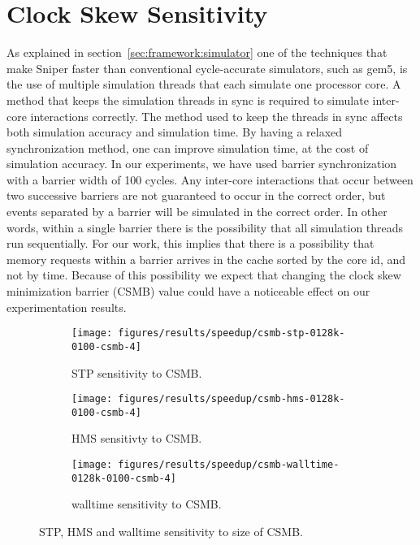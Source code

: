 \section{Clock Skew Sensitivity}
\label{sec:results:csmb_sensitivity}

As explained in section~\ref{sec:framework:simulator} one of the techniques that make Sniper faster than conventional cycle-accurate simulators, such as gem5, is the use of multiple simulation threads that each simulate one processor core.
A method that keeps the simulation threads in sync is required to simulate inter-core interactions correctly.
The method used to keep the threads in sync affects both simulation accuracy and simulation time.
By having a relaxed synchronization method, one can improve simulation time, at the cost of simulation accuracy.
In our experiments, we have used barrier synchronization with a barrier width of 100 cycles.
Any inter-core interactions that occur between two successive barriers are not guaranteed to occur in the correct order, but events separated by a barrier will be simulated in the correct order.
In other words, within a single barrier there is the possibility that all simulation threads run sequentially.
For our work, this implies that there is a possibility that memory requests within a barrier arrives in the cache sorted by the core id, and not by time.
Because of this possibility we expect that changing the clock skew minimization barrier (CSMB) value could have a noticeable effect on our experimentation results.

\begin{figure}[th]
    \centering
    \begin{subfigure}[b]{0.5\textwidth}
        \texttt{[image: figures/results/speedup/csmb-stp-0128k-0100-csmb-4]}
        \caption{STP sensitivity to CSMB.}
        \label{fig:results:csmb:stp}
    \end{subfigure}%
    \begin{subfigure}[b]{0.5\textwidth}
        \texttt{[image: figures/results/speedup/csmb-hms-0128k-0100-csmb-4]}
        \caption{HMS sensitivty to CSMB.}
        \label{fig:results:csmb:hms}
    \end{subfigure}
    \begin{subfigure}[b]{0.6\textwidth}
        \texttt{[image: figures/results/speedup/csmb-walltime-0128k-0100-csmb-4]}
        \caption{walltime sensitivity to CSMB.}
        \label{fig:results:csmb:walltime}
    \end{subfigure}
    \caption{STP, HMS and walltime sensitivity to size of CSMB.}
    \label{fig:results:csmb}
\end{figure}


